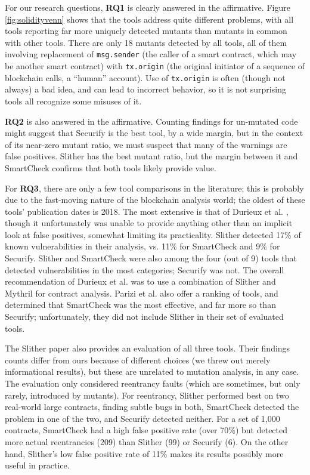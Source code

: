 For our research questions, {\bf RQ1} is clearly answered in the affirmative.  Figure \ref{fig:solidityvenn} shows that the tools address quite different problems, with all tools reporting far more uniquely detected mutants than mutants in common with other tools.  There are only 18 mutants detected by all tools, all of them involving replacement of {\tt msg.sender} (the caller of a smart contract, which may be another smart contract) with {\tt tx.origin} (the original initiator of a sequence of blockchain calls, a ``human'' account).  Use of {\tt tx.origin} is often (though not always) a bad idea, and can lead to incorrect behavior, so it is not surprising tools all recognize some misuses of it.

{\bf RQ2} is also answered in the affirmative.  Counting findings for un-mutated code might suggest that Securify is the best tool, by a wide margin, but in the context of its near-zero mutant ratio, we must suspect that many of the warnings are false positives.  Slither has the best mutant ratio, but the margin between it and SmartCheck confirms that both tools likely provide value.

For {\bf RQ3}, there are only a few tool comparisons in the literature; this is probably due to the fast-moving nature of the blockchain analysis world; the oldest of these tools' publication dates is 2018.  The most extensive is that of Durieux et al. \cite{durieux2019empirical}, though it unfortunately was unable to provide anything other than an implicit look at false positives, somewhat limiting its practicality.  Slither detected 17\% of known vulnerabilities in their analysis, vs. 11\% for SmartCheck and 9\% for Securify. Slither and SmartCheck were also among the four (out of 9) tools that detected vulnerabilities in the most categories; Securify was not.  The overall recommendation of Durieux et al. was to use a combination of Slither and Mythril \cite{mythril-code} for contract analysis.  Parizi et al. \cite{Parizi} also offer a ranking of tools, and determined that SmartCheck was the most effective, and far more so than Securify; unfortunately, they did not include Slither in their set of evaluated tools.

The Slither paper \cite{slither} also provides an evaluation of all three tools.  Their findings counts differ from ours because of different choices (we threw out merely informational results), but these are unrelated to mutation analysis, in any case.  The evaluation only considered reentrancy faults \cite{SurveyAttacks,FC20} (which are sometimes, but only rarely, introduced by mutants).  For reentrancy, Slither performed best on two real-world large contracts, finding subtle bugs in both, SmartCheck detected the problem in one of the two, and Securify detected neither.  For a set of 1,000 contracts, SmartCheck had a high false positive rate (over 70\%) but detected more actual reentrancies (209) than Slither (99) or Securify (6).  On the other hand, Slither's low false positive rate of 11\%  makes its results possibly more useful in practice.

